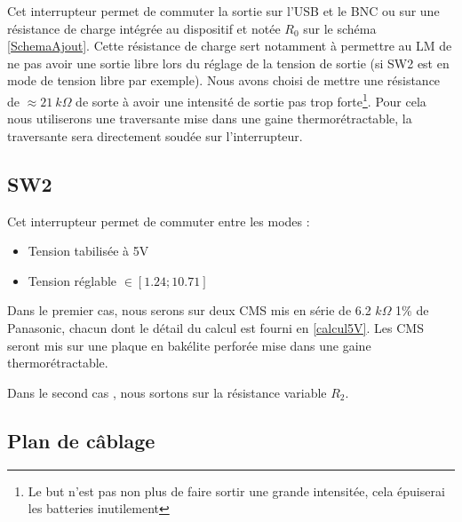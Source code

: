 \documentclass[12pt]{article}
\begin{document}
Cet interrupteur permet de commuter la sortie sur l'USB et le BNC ou sur une résistance de charge intégrée au dispositif
et notée $R_0$ sur le schéma \ref{SchemaAjout}. Cette résistance de charge sert notamment à permettre au LM de ne pas avoir
une sortie libre lors du réglage de la tension de sortie (si SW2 est en mode de tension libre par exemple). Nous avons 
choisi de mettre une résistance de $\approx 21\ k\Omega$ de sorte à avoir une intensité de sortie pas trop forte\footnote{
Le but n'est pas non plus de faire sortir une grande intensitée, cela épuiserai les batteries inutilement}. Pour
cela nous utiliserons une traversante mise dans une gaine thermorétractable, la traversante sera directement soudée 
sur l'interrupteur.

\subsection{SW2}

Cet interrupteur permet de commuter entre les modes :

\begin{itemize}
	\item Tension tabilisée à 5V
	\item Tension réglable $\in [1.24 ; 10.71]$\\
\end{itemize}

Dans le premier cas, nous serons sur deux CMS mis en série de 6.2 $k\Omega$ 1\% de Panasonic, chacun dont 
le détail du calcul est fourni en \ref{calcul5V}. Les CMS seront mis sur une plaque en bakélite perforée mise dans
une gaine thermorétractable.\newline

Dans le second cas , nous sortons sur la résistance variable $R_2$.

\subsection{Plan de câblage}
\end{document}

